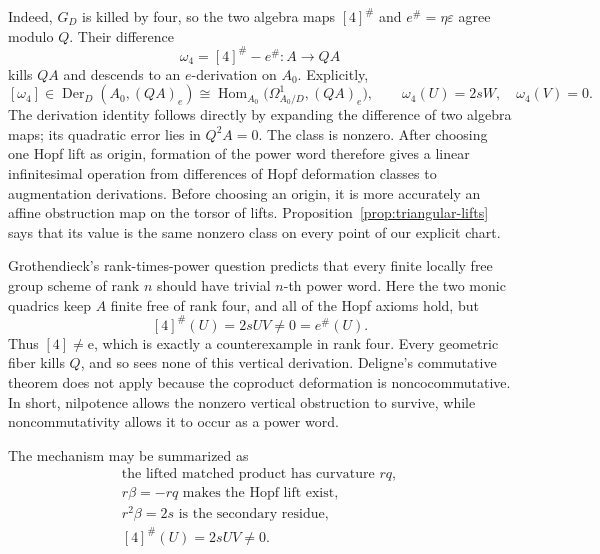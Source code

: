 \documentclass[11pt]{amsart}
\theoremstyle{definition}
\theoremstyle{remark}
\newcommand{\Der}{\operatorname{Der}}
\newcommand{\Hom}{\operatorname{Hom}}
\newcommand{\eps}{\varepsilon}
\newcommand{\unit}{\mathrm e}
\begin{document}
Indeed, \(G_D\) is killed by four, so the two algebra maps
\([4]^\#\) and \(e^\#=\eta\eps\) agree modulo \(Q\).  Their difference
\[
 \omega_4=[4]^\#-e^\#\colon A\longrightarrow QA
\]
kills \(QA\) and descends to an \(e\)-derivation on \(A_0\).  Explicitly,
\begin{equation}\label{eq:Q-power-obstruction}
 [\omega_4]\in
 \Der_D(A_0,(QA)_e)
 \cong
 \Hom_{A_0}\bigl(\Omega^1_{A_0/D},(QA)_e\bigr),
 \qquad
 \omega_4(U)=2sW,\quad \omega_4(V)=0.
\end{equation}
The derivation identity follows directly by expanding the difference of
two algebra maps; its quadratic error lies in \(Q^2A=0\).  The class is
nonzero.  After choosing one Hopf lift as origin, formation of the power
word therefore gives a linear infinitesimal operation from differences of
Hopf deformation classes to augmentation derivations.  Before choosing an
origin, it is more accurately an affine obstruction map on the torsor of
lifts.  Proposition~\ref{prop:triangular-lifts} says that its value is the
same nonzero class on every point of our explicit chart.

Grothendieck's rank-times-power question predicts that every finite
locally free group scheme of rank \(n\) should have trivial \(n\)-th power
word.  Here the two monic quadrics keep \(A\) finite free of rank four,
and all of the Hopf axioms hold, but
\[
 [4]^\#(U)=2sUV\ne0=e^\#(U).
\]
Thus \([4]\ne\unit\), which is exactly a counterexample in rank four.
Every geometric fiber kills \(Q\), and so sees none of this vertical
derivation.  Deligne's commutative theorem does not apply because the
coproduct deformation is noncocommutative.  In short, nilpotence allows
the nonzero vertical obstruction to survive, while noncommutativity allows
it to occur as a power word.

The mechanism may be summarized as
\[
 \boxed{
 \begin{gathered}
 \text{the lifted matched product has curvature }rq,\\
 r\beta=-rq\text{ makes the Hopf lift exist},\\
 r^2\beta=2s\text{ is the secondary residue},\\
 [4]^\#(U)=2sUV\ne0.
 \end{gathered}}
\]
\end{document}
